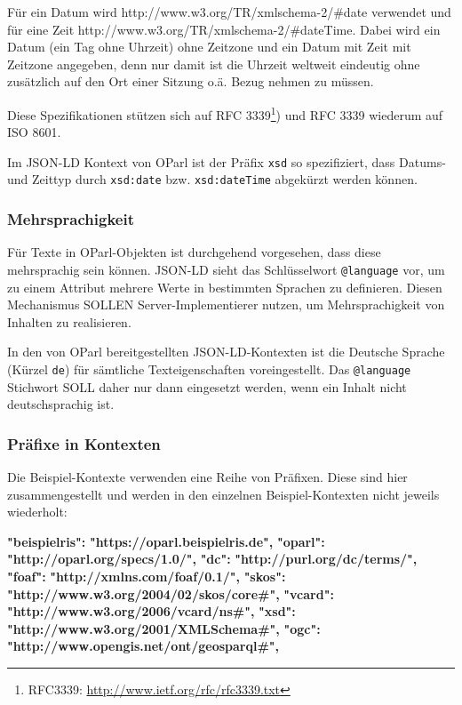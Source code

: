 \documentclass[,a4paper]{article}
\newenvironment{Shaded}{}{}
\newcommand{\ErrorTok}[1]{\textcolor[rgb]{1.00,0.00,0.00}{\textbf{{#1}}}}
\begin{document}
Für ein Datum wird http://www.w3.org/TR/xmlschema-2/\#date verwendet und
für eine Zeit http://www.w3.org/TR/xmlschema-2/\#dateTime. Dabei wird
ein Datum (ein Tag ohne Uhrzeit) ohne Zeitzone und ein Datum mit Zeit
mit Zeitzone angegeben, denn nur damit ist die Uhrzeit weltweit
eindeutig ohne zusätzlich auf den Ort einer Sitzung o.ä. Bezug nehmen zu
müssen.

Diese Spezifikationen stützen sich auf RFC 3339\footnote{RFC3339:
  \url{http://www.ietf.org/rfc/rfc3339.txt}}) und RFC 3339 wiederum auf
ISO 8601.

Im JSON-LD Kontext von OParl ist der Präfix \texttt{xsd} so
spezifiziert, dass Datums- und Zeittyp durch \texttt{xsd:date} bzw.
\texttt{xsd:dateTime} abgekürzt werden können.

\subsubsection{Mehrsprachigkeit}\label{mehrsprachigkeit}

Für Texte in OParl-Objekten ist durchgehend vorgesehen, dass diese
mehrsprachig sein können. JSON-LD sieht das Schlüsselwort
\texttt{@language} vor, um zu einem Attribut mehrere Werte in bestimmten
Sprachen zu definieren. Diesen Mechanismus SOLLEN Server-Implementierer
nutzen, um Mehrsprachigkeit von Inhalten zu realisieren.

In den von OParl bereitgestellten JSON-LD-Kontexten ist die Deutsche
Sprache (Kürzel \texttt{de}) für sämtliche Texteigenschaften
voreingestellt. Das \texttt{@language} Stichwort SOLL daher nur dann
eingesetzt werden, wenn ein Inhalt nicht deutschsprachig ist.

\subsubsection{Präfixe in Kontexten}\label{pruxe4fixe-in-kontexten}

Die Beispiel-Kontexte verwenden eine Reihe von Präfixen. Diese sind hier
zusammengestellt und werden in den einzelnen Beispiel-Kontexten nicht
jeweils wiederholt:

\begin{Shaded}
\begin{Highlighting}[]
    \ErrorTok{"beispielris":} \ErrorTok{"https://oparl.beispielris.de",}
    \ErrorTok{"oparl":} \ErrorTok{"http://oparl.org/specs/1.0/",}
    \ErrorTok{"dc":} \ErrorTok{"http://purl.org/dc/terms/",}
    \ErrorTok{"foaf":} \ErrorTok{"http://xmlns.com/foaf/0.1/",}
    \ErrorTok{"skos":} \ErrorTok{"http://www.w3.org/2004/02/skos/core#",}
    \ErrorTok{"vcard":} \ErrorTok{"http://www.w3.org/2006/vcard/ns#",}
    \ErrorTok{"xsd":} \ErrorTok{"http://www.w3.org/2001/XMLSchema#",}
    \ErrorTok{"ogc":} \ErrorTok{"http://www.opengis.net/ont/geosparql#",}
\end{Highlighting}
\end{Shaded}
\end{document}
